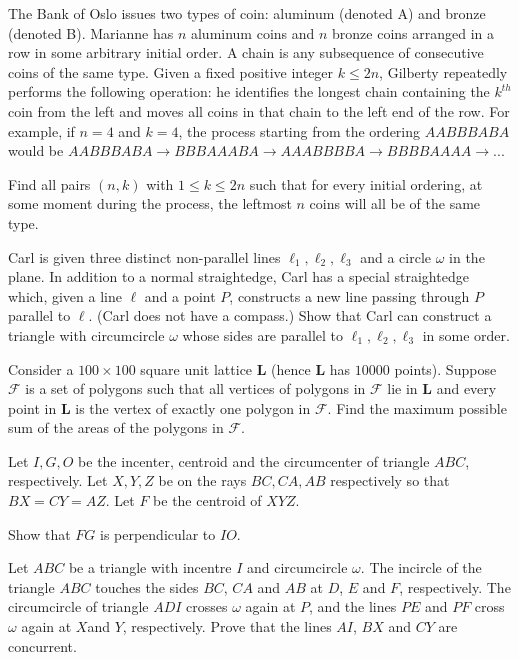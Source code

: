 \documentclass[11pt]{scrartcl}
\begin{document}
\begin{problem}[587866144613888]
The Bank of Oslo issues two types of coin: aluminum (denoted A) and bronze (denoted B). Marianne has $n$ aluminum coins and $n$ bronze coins arranged in a row in some arbitrary initial order. A chain is any subsequence of consecutive coins of the same type. Given a fixed positive integer $k \leq 2n$, Gilberty repeatedly performs the following operation: he identifies the longest chain containing the $k^{th}$ coin from the left and moves all coins in that chain to the left end of the row. For example, if $n=4$ and $k=4$, the process starting from the ordering $AABBBABA$ would be $AABBBABA \to BBBAAABA \to AAABBBBA \to BBBBAAAA \to ...$

Find all pairs $(n,k)$ with $1 \leq k \leq 2n$ such that for every initial ordering, at some moment during the process, the leftmost $n$ coins will all be of the same type.
\end{problem}
\begin{problem}[6306108494297192985]
Carl is given three distinct non-parallel lines $\ell_1, \ell_2, \ell_3$ and a circle $\omega$ in the plane. In addition to a normal straightedge, Carl has a special straightedge which, given a line $\ell$ and a point $P$, constructs a new line passing through $P$ parallel to $\ell$. (Carl does not have a compass.) Show that Carl can construct a triangle with circumcircle $\omega$ whose sides are parallel to $\ell_1,\ell_2,\ell_3$ in some order.
\end{problem}
\begin{problem}[275429739915708]
Consider a $100\times 100$ square unit lattice $\textbf{L}$ (hence $\textbf{L}$ has $10000$ points). Suppose $\mathcal{F}$ is a set of polygons such that all vertices of polygons in $\mathcal{F}$ lie in $\textbf{L}$ and every point in $\textbf{L}$ is the vertex of exactly one polygon in $\mathcal{F}.$ Find the maximum possible sum of the areas of the polygons in $\mathcal{F}.$
\end{problem}
\begin{problem}[6734490609685717062]
	Let $I,G,O$ be the incenter, centroid and the circumcenter of triangle $ABC$, respectively. Let $X,Y,Z$ be on the rays $BC, CA, AB$ respectively so that $BX=CY=AZ$. Let $F$ be the centroid of $XYZ$.

Show that $FG$ is perpendicular to $IO$.
\end{problem}
\begin{problem}[7553717274310387624]
Let $ABC$ be a triangle with incentre $I$ and circumcircle $\omega$. The incircle of the triangle $ABC$
touches the sides $BC$, $CA$ and $AB$ at $D$, $E$ and $F$, respectively. The circumcircle of triangle $ADI$ crosses $\omega$ again at $P$, and the lines $PE$ and $PF$ cross $\omega$ again at $X$and $Y$, respectively. Prove that the lines $AI$, $BX$ and $CY$ are concurrent.
\end{problem}
\end{document}
